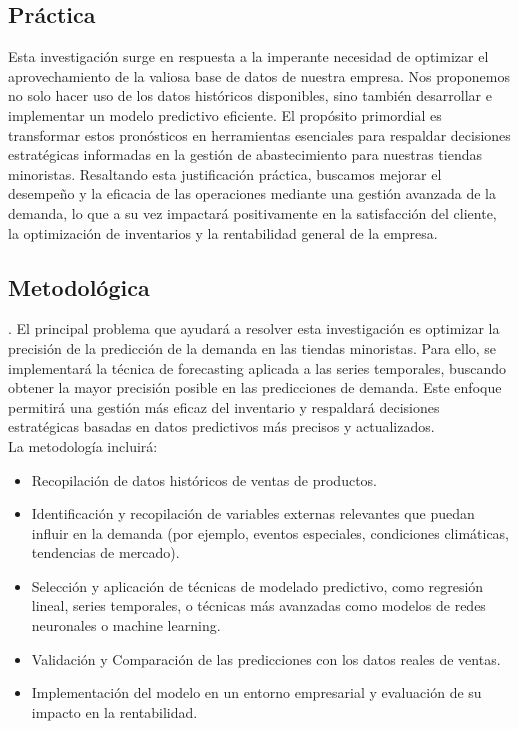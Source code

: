 \subsection{Práctica}
Esta investigación surge en respuesta a la imperante necesidad de optimizar el aprovechamiento de la valiosa base de datos de nuestra empresa. Nos proponemos no solo hacer uso de los datos históricos disponibles, sino también desarrollar e implementar un modelo predictivo eficiente. El propósito primordial es transformar estos pronósticos en herramientas esenciales para respaldar decisiones estratégicas informadas en la gestión de abastecimiento para nuestras tiendas minoristas. Resaltando esta justificación práctica, buscamos mejorar el desempeño y la eficacia de las operaciones mediante una gestión avanzada de la demanda, lo que a su vez impactará positivamente en la satisfacción del cliente, la optimización de inventarios y la rentabilidad general de la empresa.

\subsection{Metodológica}. 
 El principal problema que ayudará a resolver esta investigación es optimizar la precisión de la predicción de la demanda en las tiendas minoristas. Para ello, se implementará la técnica de forecasting aplicada a las series temporales, buscando obtener la mayor precisión posible en las predicciones de demanda. Este enfoque permitirá una gestión más eficaz del inventario y respaldará decisiones estratégicas basadas en datos predictivos más precisos y actualizados. \\
 La metodología incluirá:
 
 \newcommand{\Mone}{
 	Recopilación de datos históricos de ventas de productos.}
 \newcommand{\Mtwo}{
 	Identificación y recopilación de variables externas relevantes que puedan influir en la demanda (por ejemplo, eventos especiales, condiciones climáticas, tendencias de mercado). 
 }
 \newcommand{\Mthree}{
 	Selección y aplicación de técnicas de modelado predictivo, como regresión lineal, series temporales, o técnicas más avanzadas como modelos de redes neuronales o machine learning. 
 }
 \newcommand{\Mfour}{
	Validación y Comparación de las predicciones con los datos reales de ventas.
 	}
 \newcommand{\Mfive}{
 	Implementación del modelo en un entorno empresarial y evaluación de su impacto en la rentabilidad.
 	}
 
 \begin{itemize}
 	\item {\Mone}
 	\item {\Mtwo}
 	\item {\Mthree}
 	\item {\Mfour}
 	\item {\Mfive}
 \end{itemize}

